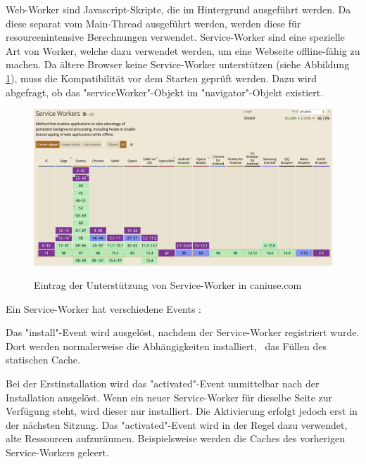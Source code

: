

Web-Worker sind Javascript-Skripte, die im Hintergrund ausgeführt werden. 
Da diese separat vom Main-Thread ausgeführt werden, werden diese für resourcenintensive Berechnungen verwendet.
Service-Worker sind eine spezielle Art von Worker, welche dazu verwendet werden, um eine Webseite offline-fähig zu machen.
Da ältere Browser keine Service-Worker unterstützen (siehe Abbildung \ref{fig:CanIUseServiceWorker}), muss die Kompatibilität vor dem Starten geprüft werden. 
Dazu wird abgefragt, ob das "serviceWorker"-Objekt im "navigator"-Objekt existiert. 

\begin{figure}[H]
    \centering
    \includegraphics[width=\textwidth]{media/ServiceWorker/CanIUseServiceWorker.png}
    \caption{Eintrag der Unterstützung von Service-Worker in caniuse.com}
    \cite{ciuServiceWorker}
    \label{fig:CanIUseServiceWorker}
\end{figure}

\clearpage


Ein Service-Worker hat verschiedene Events \cite{MDNCacheAPI}: 


Das "{\ttfamily install}"-Event wird ausgelöst, nachdem der Service-Worker registriert wurde. Dort werden normalerweise die Abhängigkeiten installiert, \zb\ das Füllen des statischen Cache.
    

Bei der Erstinstallation wird das "{\ttfamily activated}"-Event unmittelbar nach der Installation ausgelöst.
Wenn ein neuer Service-Worker für dieselbe Seite zur Verfügung steht, wird dieser nur installiert.
Die Aktivierung erfolgt jedoch erst in der nächsten Sitzung.
Das "{\ttfamily activated}"-Event wird in der Regel dazu verwendet, alte Ressourcen aufzuräumen. 
Beispielsweise werden die Caches des vorherigen Service-Workers geleert.

